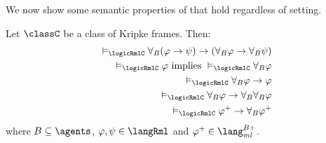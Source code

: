 We now show some semantic properties of \logicRml{} that hold regardless of setting.

\begin{proposition}\label{rml-validities}
Let $\classC$ be a class of Kripke frames. Then:
\begin{eqnarray}
    &&\entails_\logicRmlC \allrefsBs (\phi \implies \psi) \implies (\allrefsBs \phi \implies \allrefsBs \psi) \label{rml-validity-r}\\
    &&\entails_\logicRmlC \phi \text{ implies } \entails_\logicRmlC \allrefsBs \phi \label{rml-validity-necr}\\
    &&\entails_\logicRmlC \allrefsBs \phi \implies \phi \label{rml-validity-rt}\\
    &&\entails_\logicRmlC \allrefsBs \phi \implies \allrefsBs \allrefsBs \phi \label{rml-validity-r4}\\
    &&\entails_\logicRmlC \phi^+ \implies \allrefsBs \phi^+ \label{rml-validity-rp}
\end{eqnarray}
where $\agentsB \subseteq \agents$, $\phi, \psi \in \langRml$ and $\phi^+ \in \langMlPlusBs$.
\end{proposition}

